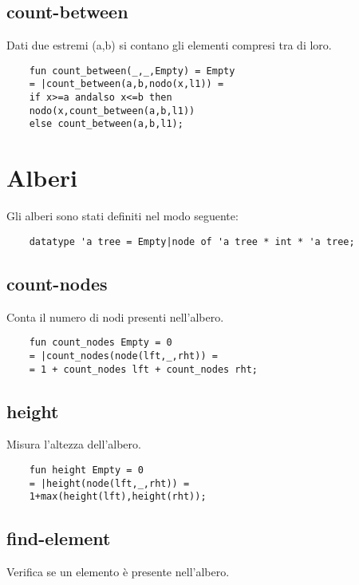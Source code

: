 \subsection{count-between}

Dati due estremi (a,b) si contano gli elementi compresi tra di loro.

\begin{lstlisting}
    fun count_between(_,_,Empty) = Empty
    = |count_between(a,b,nodo(x,l1)) = 
    if x>=a andalso x<=b then 
    nodo(x,count_between(a,b,l1)) 
    else count_between(a,b,l1);
\end{lstlisting}

\section{Alberi}

Gli alberi sono stati definiti nel modo seguente:
\begin{lstlisting}
    datatype 'a tree = Empty|node of 'a tree * int * 'a tree;
\end{lstlisting}

\subsection{count-nodes}

Conta il numero di nodi presenti nell'albero.

\begin{lstlisting}
    fun count_nodes Empty = 0
    = |count_nodes(node(lft,_,rht)) =
    = 1 + count_nodes lft + count_nodes rht;
\end{lstlisting}

\subsection{height}

Misura l'altezza dell'albero.

\begin{lstlisting}
    fun height Empty = 0
    = |height(node(lft,_,rht)) =
    1+max(height(lft),height(rht));
\end{lstlisting}

\subsection{find-element}

Verifica se un elemento è presente nell'albero.


